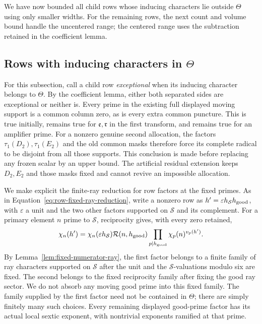 \documentclass[11pt,a4paper]{article}
\numberwithin{equation}{section}
\numberwithin{figure}{section}
\theoremstyle{definition}
\theoremstyle{remark}
\begin{document}
We have now bounded all child rows whose inducing characters lie outside
\(\Theta\) using only smaller widths.  For the remaining rows, the next
count and volume bound handle the uncentered range; the centered range
uses the subtraction retained in the coefficient lemma.

\subsection{Rows with inducing characters in \texorpdfstring{\(\Theta\)}{Theta}}

For this subsection, call a child row \emph{exceptional} when its
inducing character belongs to \(\Theta\).  By the coefficient
lemma, either both separated sides are exceptional or neither is.
Every prime in the existing full displayed moving support is a common
column zero, as is every extra common puncture.  This is true initially,
remains true for \(\mathfrak e,\mathfrak r\) in the first transform,
and remains true for an amplifier prime.  For a nonzero genuine
second allocation, the factors \(\tau_1(D_2),\tau_1(E_2)\) and the
old common masks therefore force its complete radical to be disjoint
from all those supports.  This conclusion is made before replacing
any frozen scalar by an upper bound.  The artificial residual
extension keeps \(D_2,E_2\) and those masks fixed and cannot revive
an impossible allocation.

We make explicit the finite-ray reduction for row factors at the fixed
primes.  As in Equation~\eqref{eq:row-fixed-ray-reduction}, write a nonzero row as
\(h'=\varepsilon h_{\mathcal S}h_{\rm good}\), with
\(\varepsilon\) a unit and the two other factors supported on
\(\mathcal S\) and its complement.  For a primary element \(n\)
prime to \(\mathcal S\), reciprocity gives, with every zero retained,
\[
 \chi_n(h')=\chi_n(\varepsilon h_{\mathcal S})
   \mathcal R(n,h_{\rm good})
   \prod_{p\mid h_{\rm good}}\chi_p(n)^{v_p(h')}.
\]
By Lemma~\ref{lem:fixed-numerator-ray}, the first factor belongs to
a finite family of ray characters supported on \(\mathcal S\) after
the unit and the \(\mathcal S\)-valuations modulo six are fixed.
The second belongs to the fixed reciprocity family after fixing the
good ray sector.  We do not absorb any moving good prime into this
fixed family.  The family supplied by the first factor need not be
contained in \(\Theta\); there are simply finitely many such choices.
Every remaining displayed good-prime factor has its actual local
sextic exponent, with nontrivial exponents ramified at that prime.
\end{document}

